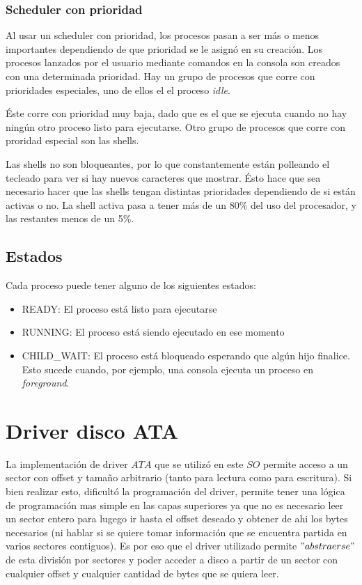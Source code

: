 \documentclass[english]{article}
\begin{document}
\subsubsection{Scheduler con prioridad}
Al usar un scheduler con prioridad, los procesos pasan a ser más o menos importantes dependiendo de que prioridad se le asignó en su creación. Los procesos lanzados por el usuario mediante comandos en la consola son creados con una determinada prioridad. Hay un grupo de procesos que corre con prioridades especiales, uno de ellos el el proceso \emph{idle}.

Éste corre con prioridad muy baja, dado que es el que se ejecuta cuando no hay ningún otro proceso listo para ejecutarse. Otro grupo de procesos que corre con proridad especial son las shells.

Las shells no son bloqueantes, por lo que constantemente están polleando el tecleado para ver si hay nuevos caracteres que mostrar. Ésto hace que sea necesario hacer que las shells tengan distintas prioridades dependiendo de si están activas o no. La shell activa pasa a tener más de un 80\% del uso del procesador, y las restantes menos de un 5\%.

\subsection{Estados}
Cada proceso puede tener alguno de los siguientes estados:
\begin{itemize}
\item READY: El proceso está listo para ejecutarse
\item RUNNING: El proceso está siendo ejecutado en ese momento
\item CHILD\_WAIT: El proceso está bloqueado esperando que algún hijo finalice. Esto sucede cuando, por ejemplo, una consola ejecuta un proceso en \emph{foreground}.
\end{itemize}

\pagebreak{}

\section{Driver disco ATA}

La implementación de driver $ATA$ que se utilizó en este $SO$ permite
acceso a un sector con offset y tamaño arbitrario (tanto para lectura
como para escritura). Si bien realizar esto, dificultó la programación
del driver, permite tener una lógica de programación mas simple en
las capas superiores ya que no es necesario leer un sector entero
para lugego ir hasta el offset deseado y obtener de ahi los bytes
necesarios (ni hablar si se quiere tomar información que se encuentra
partida en varios sectores contiguos). Es por eso que el driver utilizado
permite $"abstraerse"$ de esta división por sectores y poder acceder
a disco a partir de un sector con cualquier offset y cualquier cantidad
de bytes que se quiera leer.
\end{document}
